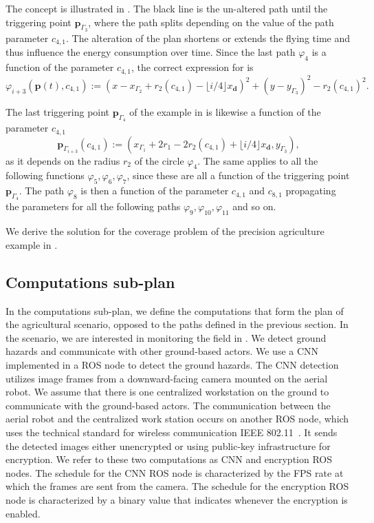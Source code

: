 The concept is illustrated in . The black line is the un-altered path until the triggering point $\mathbf{p}_{\Gamma_3}$, where the path splits depending on the value of the path parameter $c_{4,1}$. The alteration of the plan shortens or extends the flying time and thus influence the energy consumption over time. Since the last path $\varphi_4$ is a function of the parameter $c_{4,1}$, the correct expression for  is 
\begin{equation}\label{eq:line-gene-param}
  \varphi_{i+3}(\mathbf{p}(t),c_{4,1}):=(x-x_{\Gamma_2}+r_2(c_{4,1})-\lfloor i/4\rfloor x_\mathbf{d})^2+(y-y_{\Gamma_3})^2-r_2(c_{4,1})^2.
\end{equation}

The last triggering point $\mathbf{p}_{\Gamma_4}$ of the example in  is likewise a function of the parameter $c_{4,1}$
\begin{equation}
  \mathbf{p}_{\Gamma_{i+3}}(c_{4,1}):=(x_{\Gamma_1}+2r_1-2r_2(c_{4,1})+\lfloor i/4\rfloor x_\mathbf{d},y_{\Gamma_3}),
\end{equation}
as it depends on the radius $r_2$ of the circle $\varphi_4$. The same applies to all the following functions $\varphi_5,\varphi_6,\varphi_7$, since these are all a function of the triggering point $\mathbf{p}_{\Gamma_4}$. The path $\varphi_8$ is then a function of the parameter $c_{4,1}$ and $c_{8,1}$ propagating the parameters for all the following paths $\varphi_9,\varphi_{10},\varphi_{11}$ and so on.

We derive the solution for the coverage problem of the precision agriculture example in .

\subsection{Computations sub-plan}
\label{sec:computation-wise}

In the computations sub-plan, we define the computations that form the plan of the agricultural scenario, opposed to the paths defined in the previous section. In the scenario, we are interested in monitoring the field in . We detect ground hazards and communicate with other ground-based actors. We use a CNN implemented in a ROS node to detect the ground hazards. The CNN detection utilizes image frames from a downward-facing camera mounted on the aerial robot. We assume that there is one centralized workstation on the ground to communicate with the ground-based actors. The communication between the aerial robot and the centralized work station occurs on another ROS node, which uses the technical standard for wireless communication IEEE 802.11~\citep{crow1997ieee}. It sends the detected images either unencrypted or using public-key infrastructure for encryption. We refer to these two computations as CNN and encryption ROS nodes. The schedule for the CNN ROS node is characterized by the FPS rate at which the frames are sent from the camera. The schedule for the encryption ROS node is characterized by a binary value that indicates whenever the encryption is enabled.

